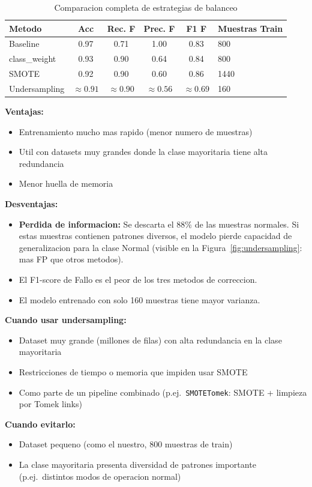 \documentclass[12pt,a4paper]{article}
\begin{document}
\begin{table}[H]
  \centering
  \caption{Comparacion completa de estrategias de balanceo}
  \label{tab:final_comparison}
  \begin{tabular}{lccccl}
    \toprule
    \textbf{Metodo} & \textbf{Acc} & \textbf{Rec. F} & \textbf{Prec. F} & \textbf{F1 F} & \textbf{Muestras Train} \\
    \midrule
    Baseline         & 0.97 & 0.71 & 1.00 & 0.83 & 800       \\
    class\_weight    & 0.93 & 0.90 & 0.64 & 0.84 & 800       \\
    SMOTE            & 0.92 & 0.90 & 0.60 & 0.86 & 1440      \\
    Undersampling    & $\approx 0.91$ & $\approx 0.90$ & $\approx 0.56$ & $\approx 0.69$ & 160 \\
    \bottomrule
  \end{tabular}
\end{table}

\begin{tcolorbox}[warnbox, title={Trade-offs del submuestreo aleatorio}]
  \textbf{Ventajas:}
  \begin{itemize}
    \item Entrenamiento mucho mas rapido (menor numero de muestras)
    \item Util con datasets muy grandes donde la clase mayoritaria tiene alta redundancia
    \item Menor huella de memoria
  \end{itemize}
  \textbf{Desventajas:}
  \begin{itemize}
    \item \textbf{Perdida de informacion:} Se descarta el 88\% de las muestras normales.
      Si estas muestras contienen patrones diversos, el modelo pierde capacidad de generalizacion
      para la clase Normal (visible en la Figura~\ref{fig:undersampling}: mas FP que otros metodos).
    \item El F1-score de Fallo es el peor de los tres metodos de correccion.
    \item El modelo entrenado con solo 160 muestras tiene mayor varianza.
  \end{itemize}
  \textbf{Cuando usar undersampling:}
  \begin{itemize}
    \item Dataset muy grande (millones de filas) con alta redundancia en la clase mayoritaria
    \item Restricciones de tiempo o memoria que impiden usar SMOTE
    \item Como parte de un pipeline combinado (p.ej.\ \texttt{SMOTETomek}: SMOTE + limpieza
      por Tomek links)
  \end{itemize}
  \textbf{Cuando evitarlo:}
  \begin{itemize}
    \item Dataset pequeno (como el nuestro, 800 muestras de train)
    \item La clase mayoritaria presenta diversidad de patrones importante (p.ej.\ distintos
      modos de operacion normal)
  \end{itemize}
\end{tcolorbox}
\end{document}
